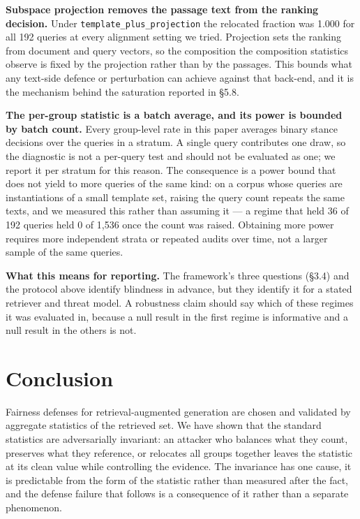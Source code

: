 \documentclass[authoryear,review,3p,times]{elsarticle}
\begin{document}
\textbf{Subspace projection removes the passage text from the ranking decision.} Under \texttt{template\_plus\_projection} the relocated fraction was 1.000 for all 192 queries at every alignment setting we tried. Projection sets the ranking from document and query vectors, so the composition the composition statistics observe is fixed by the projection rather than by the passages. This bounds what any text-side defence or perturbation can achieve against that back-end, and it is the mechanism behind the saturation reported in §5.8.

\textbf{The per-group statistic is a batch average, and its power is bounded by batch count.} Every group-level rate in this paper averages binary stance decisions over the queries in a stratum. A single query contributes one draw, so the diagnostic is not a per-query test and should not be evaluated as one; we report it per stratum for this reason. The consequence is a power bound that does not yield to more queries of the same kind: on a corpus whose queries are instantiations of a small template set, raising the query count repeats the same texts, and we measured this rather than assuming it --- a regime that held 36 of 192 queries held 0 of 1,536 once the count was raised. Obtaining more power requires more independent strata or repeated audits over time, not a larger sample of the same queries.

\textbf{What this means for reporting.} The framework's three questions (§3.4) and the protocol above identify blindness in advance, but they identify it for a stated retriever and threat model. A robustness claim should say which of these regimes it was evaluated in, because a null result in the first regime is informative and a null result in the others is not.

\section{Conclusion}\label{conclusion}

Fairness defenses for retrieval-augmented generation are chosen and validated by aggregate statistics of the retrieved set. We have shown that the standard statistics are adversarially invariant: an attacker who balances what they count, preserves what they reference, or relocates all groups together leaves the statistic at its clean value while controlling the evidence. The invariance has one cause, it is predictable from the form of the statistic rather than measured after the fact, and the defense failure that follows is a consequence of it rather than a separate phenomenon.
\end{document}
